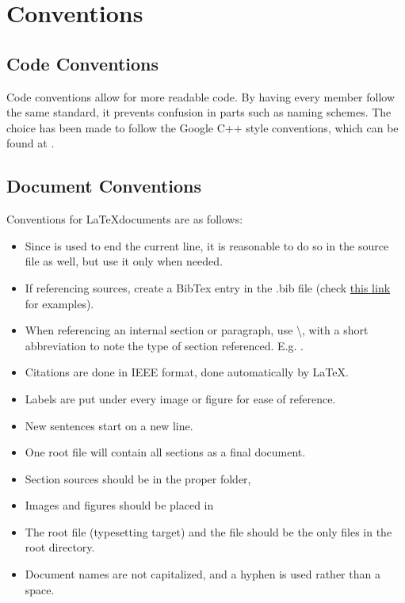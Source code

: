 \section{Conventions}
\subsection{Code Conventions}
\label{app::codecon}
Code conventions allow for more readable code.
By having every member follow the same standard, it prevents confusion in parts such as naming schemes.
The choice has been made to follow the Google C++ style conventions, which can be found at \href{https://google.github.io/styleguide/cppguide.html}{\cite{cppstyle}}.

\subsection{Document Conventions}
Conventions for \LaTeX documents are as follows:
\begin{itemize}
\item Since \code{\textbackslash\textbackslash} is used to end the current line, it is reasonable to do so in the source file as well, but use it only when needed.
\item If referencing sources, create a BibTex entry in the .bib file (check \href{https://en.wikibooks.org/wiki/LaTeX/Bibliography_Management#A_few_additional_examples}{this link} for examples).
\item When referencing an internal section or paragraph, use \textbackslash {}, with a short abbreviation to note the type of section referenced. E.g. .
\item Citations are done in IEEE format, done automatically by \LaTeX.
\item Labels are put under every image or figure for ease of reference.
\item New sentences start on a new line.
\item One root file will contain all sections as a final document.
\item Section sources should be in the proper folder, 
\item Images and figures should be placed in 
\item The root file (typesetting target) and the  file should be the only files in the root directory.
\item Document names are not capitalized, and a hyphen is used rather than a space.
\end{itemize}

